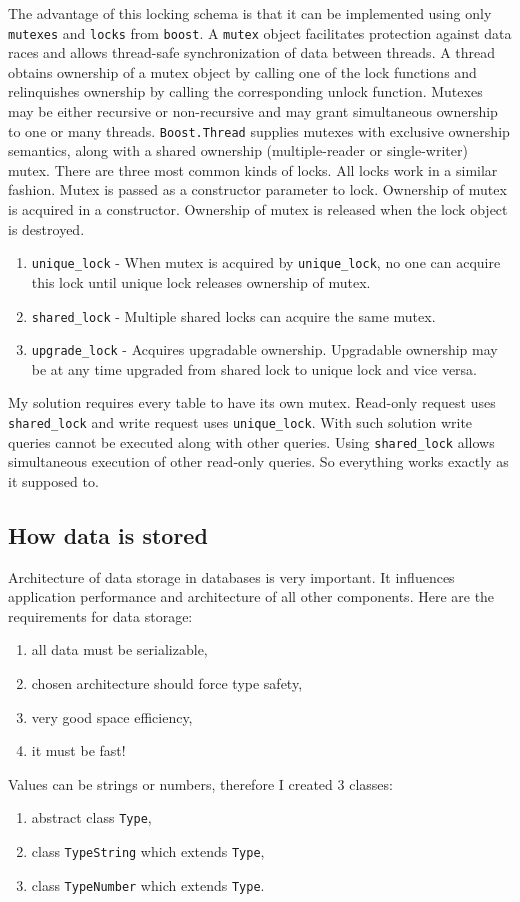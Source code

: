 \documentclass[10pt,a4paper]{article}
\begin{document}
The advantage of this locking schema is that it can be implemented using only \verb|mutexes| and \verb|locks| from \verb|boost|. A \verb|mutex| object facilitates protection against data races and allows thread-safe synchronization of data between threads. A thread obtains ownership of a mutex object by calling one of the lock functions and relinquishes ownership by calling the corresponding unlock function. Mutexes may be either recursive or non-recursive and may grant simultaneous ownership to one or many threads. \verb|Boost.Thread| supplies mutexes with exclusive ownership semantics, along with a shared ownership (multiple-reader or single-writer) mutex.
There are three most common kinds of locks. All locks work in a similar fashion. Mutex is passed as a constructor parameter to lock. Ownership of mutex is acquired in a constructor. Ownership of mutex is released when the lock object is destroyed.  

\begin{enumerate}
\item \verb|unique_lock| - When mutex is acquired by \verb|unique_lock|, no one can acquire this lock until unique lock releases ownership of mutex. 
\item \verb|shared_lock| - Multiple shared locks can acquire the same mutex.
\item \verb|upgrade_lock| - Acquires upgradable ownership. Upgradable ownership may be at any time upgraded from shared lock to unique lock and vice versa.
\end{enumerate}

My solution requires every table to have its own mutex. Read-only request uses \verb|shared_lock| and write request uses \verb|unique_lock|. With such solution write queries cannot be executed along with other queries. Using \verb|shared_lock| allows simultaneous execution of other read-only queries. So everything works exactly as it supposed to.

\subsection{How data is stored}

Architecture of data storage in databases is very important. It influences application performance and architecture of all other components. Here are the requirements for data storage: 
\begin{enumerate}
\item all data must be serializable,
\item chosen architecture should force type safety,
\item very good space efficiency,
\item it must be fast!
\end{enumerate}
Values can be strings or numbers, therefore I created 3 classes:
\begin{enumerate}
\item abstract class \verb|Type|,
\item class \verb|TypeString| which extends \verb|Type|,
\item class \verb|TypeNumber| which extends \verb|Type|.
\end{enumerate}
\end{document}
